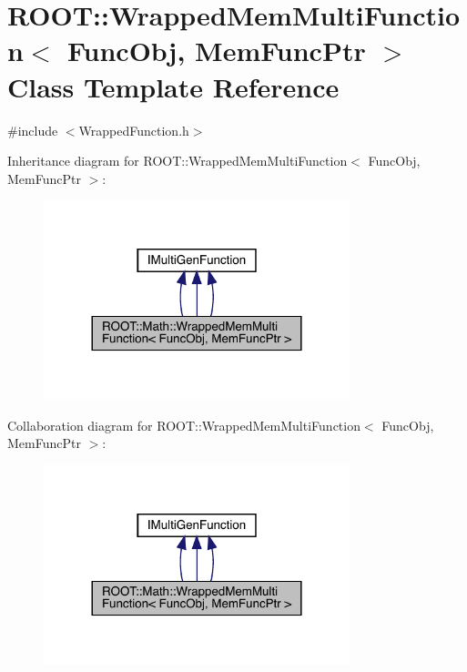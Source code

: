 \hypertarget{classROOT_1_1Math_1_1WrappedMemMultiFunction}{}\section{R\+O\+OT\+:\+:Wrapped\+Mem\+Multi\+Function$<$ Func\+Obj, Mem\+Func\+Ptr $>$ Class Template Reference}
\label{classROOT_1_1Math_1_1WrappedMemMultiFunction}


{\ttfamily \#include $<$Wrapped\+Function.\+h$>$}



Inheritance diagram for R\+O\+OT\+:\+:Wrapped\+Mem\+Multi\+Function$<$ Func\+Obj, Mem\+Func\+Ptr $>$\+:
\nopagebreak
\begin{figure}[H]
\begin{center}
\leavevmode
\includegraphics[width=252pt]{d2/d09/classROOT_1_1Math_1_1WrappedMemMultiFunction__inherit__graph}
\end{center}
\end{figure}


Collaboration diagram for R\+O\+OT\+:\+:Wrapped\+Mem\+Multi\+Function$<$ Func\+Obj, Mem\+Func\+Ptr $>$\+:
\nopagebreak
\begin{figure}[H]
\begin{center}
\leavevmode
\includegraphics[width=252pt]{d3/d6d/classROOT_1_1Math_1_1WrappedMemMultiFunction__coll__graph}
\end{center}
\end{figure}
